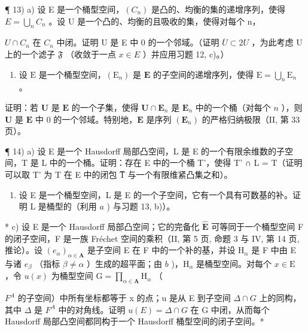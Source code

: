¶ 13) a) 设 E 是一个桶型空间，\((C_n)\) 是凸的、均衡的集的递增序列，使得 \(E = \bigcup_{n} C_n\) 。设 U 是一个凸的、均衡的且吸收的集，使得对每个 n，

\(U \cap C_{n}\) 在 \(C_{n}\) 中闭。证明 U 是 E 中 0 的一个邻域。（证明 \(\overline{U} \subset 2U\) ，为此考虑 U 上的一个滤子 \(\mathfrak{F}\) （收敛于一点 \(x \in E\) ）并应用习题 12, c)。）

\begin{enumerate}
\def\labelenumi{\alph{enumi})}
\setcounter{enumi}{1}
\tightlist
\item
  设 \(\mathrm{E}\) 是一个桶型空间，\((\mathrm{E}_n)\) 是 \(\mathbf{E}\) 的子空间的递增序列，使得 \(\mathrm{E} = \bigcup_{n} \mathrm{E}_n\) 。
\end{enumerate}

证明：若 \(\mathbf{U}\) 是 \(\mathbf{E}\) 的一个子集，使得 \(\mathbf{U} \cap \mathbf{E}_n\) 是 \(\mathbf{E}_n\) 中的一个桶（对每个 \(n\) ），则 \(\mathbf{U}\) 是 \(\mathbf{E}\) 中 0 的一个邻域。特别地，\(\mathbf{E}\) 是序列 \((\mathbf{E}_n)\) 的严格归纳极限（II, 第 33 页）。

¶ 14) a) 设 E 是一个 Hausdorff 局部凸空间，L 是 E 的一个有限余维数的子空间，T 是 L 中的一个桶。证明：存在 E 中的一个桶 T'，使得 T' ∩ L = T（证明可以取 T' 为 T 在 E 中的闭包 T̅ 与一个有限维紧凸集之和）。

\begin{enumerate}
\def\labelenumi{\alph{enumi})}
\setcounter{enumi}{1}
\tightlist
\item
  设 E 是一个桶型空间，L 是 E 的一个子空间，它有一个具有可数基的补。证明 L 是桶型的（利用 \(a\) ) 与习题 13, b)）。
\end{enumerate}

* c) 设 E 是一个 Hausdorff 局部凸空间；它的完备化 \(\hat{\mathbf{E}}\) 可等同于一个桶型空间 F 的闭子空间，F 是一族 Fréchet 空间的乘积（II, 第 5 页, 命题 3 与 IV, 第 14 页, 推论）。设 \((e_{\alpha})_{\alpha \in \mathbf{A}}\) 是子空间 E 在 F 中的一个补的基，并设 \(\mathrm{H}_{\alpha}\) 是 F 中由 E 与诸 \(e_{\beta}\) （指标 \(\beta \neq \alpha\) ）生成的超平面；由 \(b\) )，\(\mathrm{H}_{\alpha}\) 是桶型空间。对每个 \(x \in \mathrm{E}\) ，令 \(u(x)\) 为桶型空间 \(\mathrm{G} = \prod_{\alpha \in \mathbf{A}} \mathrm{H}_{\alpha}\) （

\(F^{A}\) 的子空间）中所有坐标都等于 x 的点；u 是从 E 到子空间 \(\Delta \cap G\) 上的同构，其中 \(\Delta\) 是 \(F^{A}\) 中的对角线。证明 \(u(E) = \Delta \cap G\) 在 G 中闭，从而每个 Hausdorff 局部凸空间都同构于一个 Hausdorff 桶型空间的闭子空间。*


